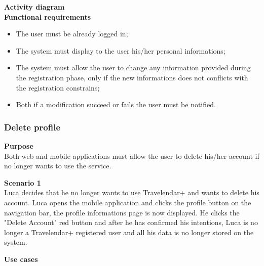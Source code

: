 \documentclass{article}
\begin{document}
	\bigskip
	\noindent
	\textbf{Activity diagram} \\
	
	
	\bigskip
	\noindent
	\textbf{Functional requirements} \\
	\begin{itemize}
		\item The user must be already logged in;
		\item The system must display to the user his/her personal informations;
		\item The system must allow the user to change any information provided during the registration phase, only if the new informations does not conflicts with the registration constrains;
		\item Both if a modification succeed or fails the user must be notified.
	\end{itemize}


	\subsubsection{Delete profile}
	
	\bigskip
	\noindent
	\textbf{Purpose} \\
	Both web and mobile applications must allow the user to delete his/her account if no longer wants to use the service.
	
	\bigskip
	\noindent
	\textbf{Scenario 1} \\
	Luca decides that he no longer wants to use Travelendar+ and wants to delete his account. Luca opens the mobile application and clicks the profile button on the navigation bar, the profile informations page is now displayed. He clicks the "Delete Account" red button and after he has confirmed his intentions, Luca is no longer a Travelendar+ registered user and all his data is no longer stored on the system.
	
	\bigskip
	\noindent
	\textbf{Use cases} \\
	
\end{document}
